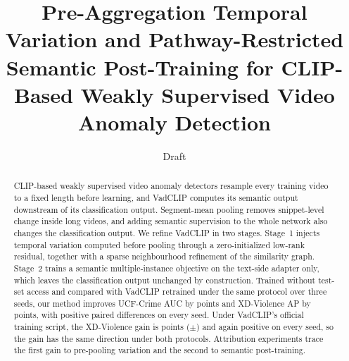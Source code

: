 \documentclass[10pt]{article}
\title{Pre-Aggregation Temporal Variation and Pathway-Restricted Semantic Post-Training for CLIP-Based Weakly Supervised Video Anomaly Detection}
\author{Draft}
\date{}
\begin{document}
\maketitle

\begin{abstract}
CLIP-based weakly supervised video anomaly detectors resample every training video to a fixed length before learning, and VadCLIP computes its semantic output downstream of its classification output. Segment-mean pooling removes snippet-level change inside long videos, and adding semantic supervision to the whole network also changes the classification output. We refine VadCLIP in two stages. Stage~1 injects temporal variation computed before pooling through a zero-initialized low-rank residual, together with a sparse neighbourhood refinement of the similarity graph. Stage~2 trains a semantic multiple-instance objective on the text-side adapter only, which leaves the classification output unchanged by construction. Trained without test-set access and compared with VadCLIP retrained under the same protocol over three seeds, our method improves UCF-Crime AUC by \ucfGainMean{} points and XD-Violence AP by \xdGainMean{} points, with positive paired differences on every seed. Under VadCLIP's official training script, the XD-Violence gain is \offGainMean{} points ($\pm$\offGainSd{}) and again positive on every seed, so the gain has the same direction under both protocols. Attribution experiments trace the first gain to pre-pooling variation and the second to semantic post-training.
\end{abstract}














\end{document}

